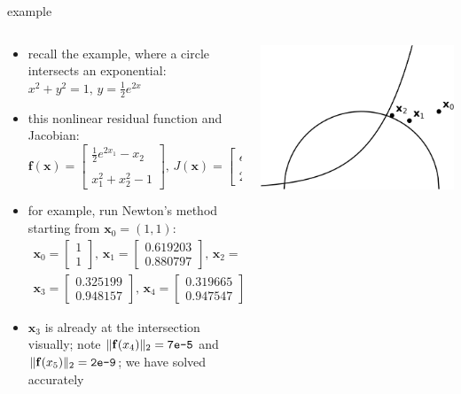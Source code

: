\documentclass[10pt,hyperref]{beamer}
\newcommand{\bbf}{\mathbf{f}}
\newcommand{\bx}{\mathbf{x}}
\newcommand{\twovect}[4]{\ensuremath{{#1}_{#2} =
                            \begin{bmatrix} #3 \\ #4 \end{bmatrix}}}
\begin{document}
\begin{frame}{example}
\begin{columns}
\begin{column}{0.65\textwidth}
\begin{itemize}
\item recall the example, where a circle intersects an exponential: $x^2+y^2 = 1, \, y = \tfrac{1}{2} e^{2x}$
\item this nonlinear residual function and Jacobian:
{\small
    $$\bbf(\bx) = \begin{bmatrix} \frac{1}{2} e^{2x_1} - x_2 \\ \\ x_1^2 + x_2^2 - 1 \end{bmatrix}, \,
    J(\bx) = \begin{bmatrix} e^{2x_1} & -1 \\ \\
                             2 x_1 & 2 x_2 \end{bmatrix}$$
}
\item for example, run Newton's method starting from $\bx_0 = (1,1)$:
{\small
\begin{gather*}
\twovect{\bx}{0}{1}{1}, \, \twovect{\bx}{1}{0.619203}{0.880797}, \, \twovect{\bx}{2}{0.394157}{0.948623},\\
\twovect{\bx}{3}{0.325199}{0.948157}, \, \twovect{\bx}{4}{0.319665}{0.947547}\dots
\end{gather*}
}
\item $\bx_3$ is already at the intersection visually; note $\|\bbf(x_4)\|_2 = \text{\texttt{7e-5}}$ and $\|\bbf(x_5)\|_2 = \text{\texttt{2e-9}}$; we have solved accurately
\end{itemize}
\end{column}
\begin{column}{0.35\textwidth}
\includegraphics[width=\textwidth]{newtonexample.png}
\end{column}
\end{columns}
\end{frame}
\end{document}
